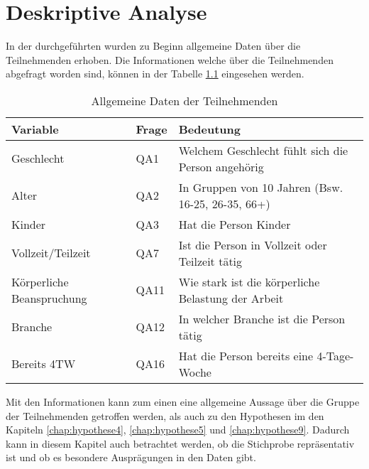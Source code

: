 \chapter{Deskriptive Analyse}

In der durchgeführten wurden zu Beginn allgemeine Daten über die Teilnehmenden erhoben.
Die Informationen welche über die Teilnehmenden abgefragt worden sind, können in der Tabelle
\ref{tab:allgemeine_daten} eingesehen werden.

\begin{table}[h]
    \centering
    \begin{tabular}{|l|l|p{8cm}|}
        \hline
        \textbf{Variable} & \textbf{Frage} & \textbf{Bedeutung}\\
        \hline
        Geschlecht & QA1 & Welchem Geschlecht fühlt sich die Person angehörig\\
        Alter & QA2 & In Gruppen von 10 Jahren (Bsw. 16-25, 26-35, 66+)\\
        Kinder & QA3 & Hat die Person Kinder\\
        Vollzeit/Teilzeit & QA7 & Ist die Person in Vollzeit oder Teilzeit tätig\\
        Körperliche Beanspruchung & QA11 & Wie stark ist die körperliche Belastung der Arbeit\\
        Branche & QA12 & In welcher Branche ist die Person tätig\\
        Bereits 4TW & QA16 & Hat die Person bereits eine 4-Tage-Woche\\
        \hline
    \end{tabular}
    \caption{Allgemeine Daten der Teilnehmenden}
    \label{tab:allgemeine_daten}
\end{table}

Mit den Informationen kann zum einen eine allgemeine Aussage über die Gruppe der Teilnehmenden 
getroffen werden, als auch zu den Hypothesen im den Kapiteln \ref{chap:hypothese4},
\ref{chap:hypothese5} und \ref{chap:hypothese9}. Dadurch kann in diesem Kapitel auch betrachtet
werden, ob die Stichprobe repräsentativ ist und ob es besondere Ausprägungen in den Daten gibt.
 